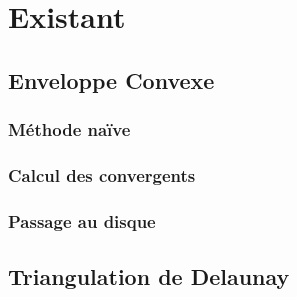 \section{Existant}

\subsection{Enveloppe Convexe}

\subsubsection{Méthode naïve}

\subsubsection{Calcul des convergents}

\subsubsection{Passage au disque}

\subsection{Triangulation de Delaunay}

